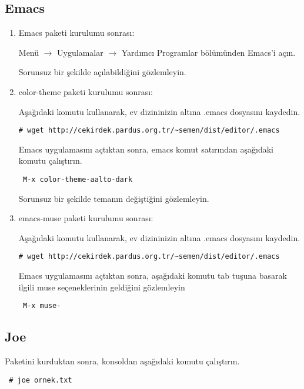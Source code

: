 \documentclass[a4paper,10pt]{article}
\begin{document}
\subsection*{Emacs}
\begin{enumerate}
\item Emacs paketi kurulumu sonrası:

Menü $\rightarrow$ Uygulamalar $\rightarrow$ Yardımcı Programlar bölümünden Emacs'i açın.

Sorunsuz bir şekilde açılabildiğini gözlemleyin.

\item color-theme paketi kurulumu sonrası:


Aşağıdaki komutu kullanarak, ev dizininizin altına .emacs dosyasını kaydedin.
\begin{verbatim}
# wget http://cekirdek.pardus.org.tr/~semen/dist/editor/.emacs 
\end{verbatim}

Emacs uygulamasını açtıktan sonra, emacs komut satırından aşağıdaki komutu çalıştırın.
\begin{verbatim}
 M-x color-theme-aalto-dark
\end{verbatim}

Sorunsuz bir şekilde temanın değiştiğini gözlemleyin.

\item emacs-muse paketi kurulumu sonrası:

Aşağıdaki komutu kullanarak, ev dizininizin altına .emacs dosyasını kaydedin.
\begin{verbatim}
# wget http://cekirdek.pardus.org.tr/~semen/dist/editor/.emacs 
\end{verbatim}

Emacs uygulamasını açtıktan sonra, aşağıdaki komutu tab tuşuna basarak ilgili muse seçeneklerinin geldiğini gözlemleyin
\begin{verbatim}
 M-x muse-
\end{verbatim}


\end{enumerate}


\subsection*{Joe}

Paketini kurduktan sonra, konsoldan aşağıdaki komutu çalıştırın.

\begin{verbatim}
 # joe ornek.txt
\end{verbatim}
\end{document}
